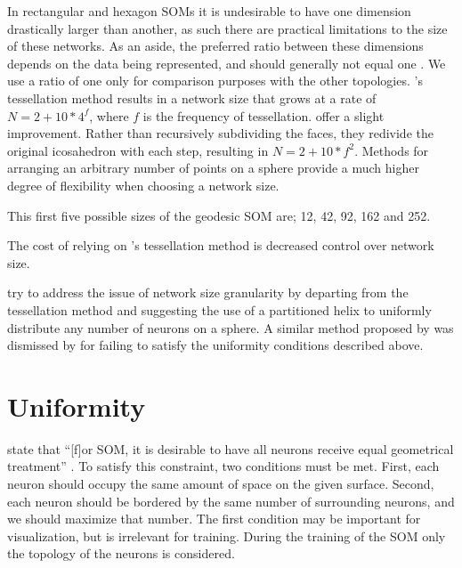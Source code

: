 In rectangular and hexagon SOMs it is undesirable to have one
dimension drastically larger than another, as such there are practical
limitations to the size of these networks.  As an aside, the preferred ratio
between these dimensions depends on the data being represented, and should
generally not equal one \citep{kohonen1996, toolbox}. We use a ratio of one
only for comparison purposes with the other topologies.
\citeauthor{ritter99}'s tessellation method results in a network size that
grows at a rate of \(N=2+10*4^f\), where $f$ is the frequency of tessellation.
\cite{wu2006} offer a slight improvement. Rather than recursively subdividing
the faces, they redivide the original icosahedron with each step, resulting in
\(N=2+10*f^2\).  Methods for arranging an arbitrary number of points on a
sphere provide a much higher degree of flexibility when choosing a network
size.


This first five possible sizes of the geodesic SOM are; 12, 42, 92, 162 and 252.  

The cost of relying on \citeauthor{ritter99}'s tessellation method is
decreased control over network size. 




\cite{Nishio:2006fk} try to address the
issue of network size granularity by departing from the tessellation method and
suggesting the use of a partitioned helix to uniformly distribute any number of
neurons on a sphere.  A similar method proposed by \cite{Rakhmanov94} was
dismissed by \cite{wu2005} for failing to satisfy the uniformity conditions
described above.


\section{Uniformity}
\citeauthor{wu2006} state that ``[f]or SOM, it is desirable to have all neurons
receive equal geometrical treatment'' \cite[p. 900]{wu2006}.  To satisfy this
constraint, two conditions must be met.  First, each neuron should occupy the
same amount of space on the given surface.  Second, each neuron should be
bordered by the same number of surrounding neurons, and we should maximize that
number.  The first condition may be important for visualization, but is
irrelevant for training.  During the training of the SOM only the topology of
the neurons is considered.

